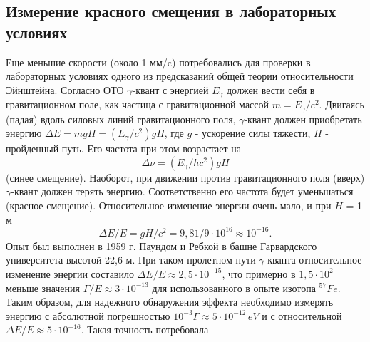 \documentclass{article}
\begin{document}
\subsection{Измерение красного смещения в лабораторных условиях}
\hspace{12pt} Еще меньшие скорости (около 1 мм/c) потребовались для проверки в лабораторных условиях одного из предсказаний общей теории относительности Эйнштейна. Согласно ОТО $\gamma$-квант с энергией $E_{\gamma}$ должен вести себя в гравитационном поле, как частица с гравитационной массой $m = E_{\gamma} / c^2$. Двигаясь (падая) вдоль силовых линий гравитационного поля, $\gamma$-квант должен приобретать энергию $\Delta E = mgH = (E_{\gamma} / c^2)gH$, где $g$ - ускорение силы тяжести, $H$ - пройденный путь. Его частота при этом возрастает на
$$ \Delta \nu = (E_{\gamma}/hc^2)gH $$
(синее смещение).
\indent Наоборот, при движении против гравитационного поля (вверх) $\gamma$-квант должен терять энергию. Соответственно его частота будет уменьшаться (красное смещение). Относительное изменение энергии очень мало, и при $H$ = 1 м
$$ \Delta E/E = gH/c^2 = 9,81/9\cdot 10^{16} \approx 10^{-16} .$$
\indent Опыт был выполнен в 1959 г. Паундом и Ребкой в башне Гарвардского университета высотой 22,6 м. При таком пролетном пути $\gamma$-кванта относительное изменение энергии составило $\Delta E/E \approx 2,5 \cdot 10^{-15}$, что примерно в $1,5 \cdot 10^{2}$ меньше значения $\Gamma/E \approx 3 \cdot 10^{-13}$ для использованного в опыте изотопа $^{57}Fe$. Таким образом, для надежного обнаружения эффекта необходимо измерять энергию с абсолютной погрешностью $10^{-3} \Gamma \approx 5 \cdot 10^{-12} \hspace{2pt} eV$ и с относительной $\Delta E/E \approx 5 \cdot 10^{-16}$. Такая точность потребовала
\end{document}
